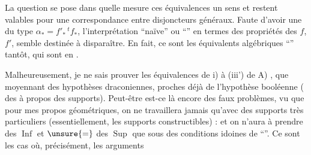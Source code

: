 
La question se pose dans quelle mesure ces équivalences   un sens et restent valables pour une correspondance entre disjoncteurs généraux. Faute d'avoir une  du type $\alpha_*=f'_*\,{}^{t}f_*$,  l'interprétation ``naïve'' ou ``'' en termes des propriétés des $f$, $f'$,  semble destinée à disparaître. En fait, ce sont les équivalents algébriques ``'' tantôt, qui sont en .

Malheureusement, je ne sais prouver les équivalences de i) à (iii') de A) , que moyennant des hypothèses draconiennes, proches déjà de l'hypothèse booléenne (    des  à propos des supports). Peut-être est-ce là encore des faux problèmes, vu que pour mes propos géométriques, on ne travaillera jamais qu'avec des supports très particuliers (essentiellement, les supports constructibles) : et on n'aura à prendre des $\operatorname{Inf}$ et $\unsure{=}$ des $\operatorname{Sup}$ que sous des conditions idoines de ``''. Ce sont les cas où, précisément, les arguments
